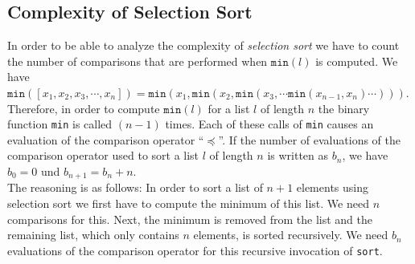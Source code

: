\subsection{Complexity of Selection Sort}
In order to be able to analyze the complexity of \emph{selection sort} we have to count the number
of comparisons that are performed when $\mathtt{min}(l)$ is computed.  We have 
\\[0.2cm]
\hspace*{1.3cm} 
$\mathtt{min}([x_1,x_2,x_3,\cdots,x_n]) = \mathtt{min}(x_1, \mathtt{min}(x_2, \mathtt{min}(x_3, \cdots \mathtt{min}(x_{n-1},x_n) \cdots )))$. 
\\[0.2cm]
Therefore, in order to compute $\texttt{min}(l)$ for a list $l$ of length $n$ the binary function \texttt{min}
is called $(n-1)$ times.  Each of these calls of \texttt{min} causes an evaluation of the comparison
operator ``$\preceq$''.  If the number of evaluations of the comparison operator used to sort a list
$l$ of length $n$ is written as $b_n$, we have \\[0.2cm]
\hspace*{1.3cm}
$b_0 = 0$ \quad und \quad $b_{n+1} = b_n + n$. 
\\[0.2cm]
The reasoning is as follows: In order to sort a list of $n+1$ elements using selection sort we first
have to compute the minimum of this list.  We need $n$ comparisons for this.  Next, the minimum is
removed from the list and the remaining list, which only contains $n$ elements, is sorted
recursively.  We need $b_n$ evaluations of the comparison operator for this recursive invocation of
\texttt{sort}.

